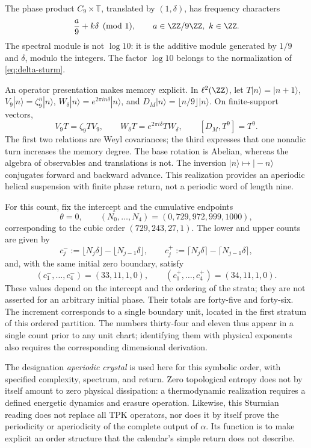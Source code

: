 The phase product \(C_9\times\mathbb T\), translated by \((1,\delta)\), has frequency characters
\[
 \frac a9+k\delta\pmod1,\qquad a\in\ZZ/9\ZZ,\ k\in\ZZ.
\]
The spectral module is not \(\log10\): it is the additive module generated by \(1/9\) and \(\delta\), modulo the integers. The factor \(\log10\) belongs to the normalization of \eqref{eq:delta-sturm}.

An operator presentation makes memory explicit. In \(\ell^2(\ZZ)\), let \(T|n\rangle=|n+1\rangle\), \(V_9|n\rangle=\zeta_9^n|n\rangle\), \(W_\delta|n\rangle=e^{2\pi i n\delta}|n\rangle\), and \(D_M|n\rangle=\lfloor n/9\rfloor|n\rangle\). On finite-support vectors,
\begin{equation}
 V_9T=\zeta_9TV_9,\qquad
 W_\delta T=e^{2\pi i\delta}TW_\delta,\qquad
 [D_M,T^9]=T^9.
 \label{eq:weyl-relojes}
\end{equation}
The first two relations are Weyl covariances; the third expresses that one nonadic turn increases the memory degree. The base rotation is Abelian, whereas the algebra of observables and translations is not. The inversion \(|n\rangle\mapsto|-n\rangle\) conjugates forward and backward advance. This realization provides an aperiodic helical suspension with finite phase return, not a periodic word of length nine.



For this count, fix the intercept and the cumulative endpoints
\[
 \theta=0,\qquad
 (N_0,\ldots,N_4)=(0,729,972,999,1000),
\]
corresponding to the cubic order \((729,243,27,1)\). The lower and upper
counts are given by
\[
 c_j^-:=\lfloor N_j\delta\rfloor-\lfloor N_{j-1}\delta\rfloor,
 \qquad
 c_j^+:=\lceil N_j\delta\rceil-\lceil N_{j-1}\delta\rceil,
\]
and, with the same initial zero boundary, satisfy
\[
 (c_1^-,\ldots,c_4^-)=(33,11,1,0),\qquad
 (c_1^+,\ldots,c_4^+)=(34,11,1,0).
\]
These values depend on the intercept and the ordering of the strata; they are
not asserted for an arbitrary initial phase. Their totals are forty-five and
forty-six. The increment corresponds to a single boundary unit, located in
the first stratum of this ordered partition. The numbers thirty-four and
eleven thus appear in a single count prior to any unit chart; identifying them
with physical exponents also requires the corresponding dimensional derivation.

The designation \emph{aperiodic crystal} is used here for this symbolic order, with specified complexity, spectrum, and return. Zero topological entropy does not by itself amount to zero physical dissipation: a thermodynamic realization requires a defined energetic dynamics and erasure operation. Likewise, this Sturmian reading does not replace all TPK operators, nor does it by itself prove the periodicity or aperiodicity of the complete output of \(\alpha\). Its function is to make explicit an order structure that the calendar's simple return does not describe.




